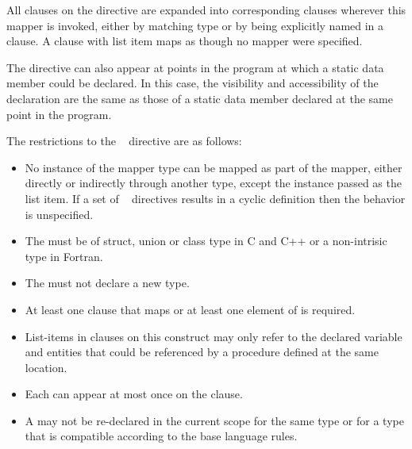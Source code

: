 All  clauses on the directive are expanded into corresponding
 clauses wherever this mapper is invoked, either by matching type or
by being explicitly named in a  clause. A  clause with list item
 maps  as though no mapper were specified.

\begin{cppspecific}
The  directive can also appear at points in the program at
which a static data member could be declared. In this case, the visibility and
accessibility of the declaration are the same as those of a static data member
declared at the same point in the program.
\end{cppspecific}

\restrictions
The restrictions to the ~ directive are as follows:

\begin{itemize}
\item No instance of the mapper type can be mapped as part of the mapper, either
      directly or indirectly through another type, except the instance passed as the
      list item. If a set of ~ directives results in a
      cyclic definition then the behavior is unspecified.
\item The  must be of struct, union or class type in C and C++ or a
      non-intrisic type in Fortran.
\item The  must not declare a new type.
\item At least one  clause that maps  or at least one element
      of  is required.
\item List-items in  clauses on this construct may only refer to the
      declared variable  and entities that could be referenced by a
      procedure defined at the same location.
\item Each  can appear at most once on the
       clause.
\item A  may not be re-declared in the current scope for the 
      same type or for a type that is compatible according to the base language rules.

\end{itemize}
